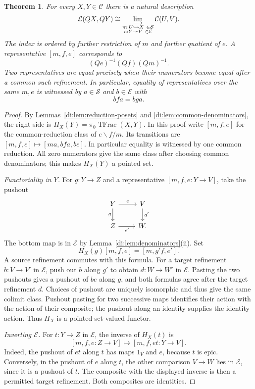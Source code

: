 \documentclass[11pt,reqno,a4paper]{amsart}
\newtheorem{theorem}{Theorem}[section]
\theoremstyle{definition}
\theoremstyle{remark}
\newcommand{\C}{\mathcal{C}}
\newcommand{\0}{\mathbf{0}}
\renewcommand{\1}{\mathbf{1}}
\newcommand{\tom}{\rightarrowtail}
\newcommand{\toe}{\twoheadrightarrow}
\newcommand{\Sden}{\mathcal S}
\newcommand{\Eden}{\mathcal E}
\newcommand{\Loc}{\mathcal L}
\DeclareMathOperator{\TFrac}{TFrac}
\begin{document}
\begin{theorem}\label{di:thm:fractions}
For every $X,Y\in\C$ there is a natural description
\begin{equation}\label{di:eq:colimit}
 \Loc(QX,QY)\cong
 \varinjlim_{\substack{m:U\tom X\ \in\Sden\\ e:Y\toe V\ \in\Eden}}
 \C(U,V).
\end{equation}
The index is ordered by further restriction of $m$ and further quotient of $e$. A representative $[m,f,e]$ corresponds to
\[
 (Qe)^{-1}(Qf)(Qm)^{-1}.
\]
Two representatives are equal precisely when their numerators become equal after a common such refinement. In particular, equality of representatives over the same $m,e$ is witnessed by $a\in\Sden$ and $b\in\Eden$ with
\[
 bfa=bga.
\]
\end{theorem}
\begin{proof}
By Lemmas~\ref{di:lem:reduction-posets} and
\ref{di:lem:common-denominators}, the right side is
$H_X(Y)=\pi_0\TFrac(X,Y)$. In this proof write $[m,f,e]$ for the
common-reduction class of $e\backslash f/m$. Its transitions are
$[m,f,e]\mapsto[ma,bfa,be]$. In particular equality is witnessed by
one common reduction. All zero
numerators give the same class after choosing common denominators;
this makes $H_X(Y)$ a pointed set.

\smallskip\noindent\emph{Functoriality in $Y$.}
For $g:Y\to Z$ and a representative $[m,f,e:Y\to V]$, take the pushout
\[
\begin{tikzcd}
Y\arrow[r,"e"]\arrow[d,"g"']&V\arrow[d,"g'"]\\
Z\arrow[r,"e'"']&W.
\end{tikzcd}
\]
The bottom map is in $\Eden$ by Lemma~\ref{di:lem:denominators}(ii). Set
\[
 H_X(g)[m,f,e]=[m,g'f,e'].
\]
A source refinement commutes with this formula. For a target refinement $b:V\to V'$ in $\Eden$, push out $b$ along $g'$ to obtain $d:W\to W'$ in $\Eden$. Pasting the two pushouts gives a pushout of $be$ along $g$, and both formulas agree after the target refinement $d$. Choices of pushout are uniquely isomorphic and thus give the same colimit class. Pushout pasting for two successive maps identifies their action with the action of their composite; the pushout along an identity supplies the identity action. Thus $H_X$ is a pointed-set-valued functor.

\smallskip\noindent\emph{Inverting $\Eden$.}
For $t:Y\to Z$ in $\Eden$, the inverse of $H_X(t)$ is
\[
 [m,f,e:Z\to V]\longmapsto[m,f,et:Y\to V].
\]
Indeed, the pushout of $et$ along $t$ has maps $1_V$ and $e$, because $t$ is epic. Conversely, in the pushout of $e$ along $t$, the other comparison $V\to W$ lies in $\Eden$, since it is a pushout of $t$. The composite with the displayed inverse is then a permitted target refinement. Both composites are identities.


\end{proof}
\end{document}
